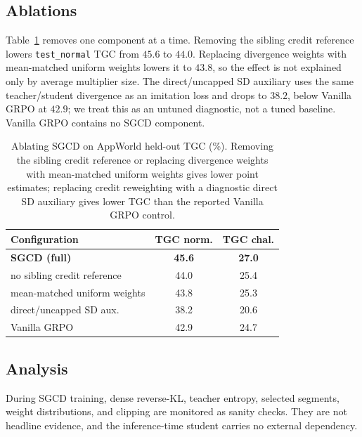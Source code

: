 \subsection{Ablations}
\label{sec:ablations}
Table~\ref{tab:ablation} removes one component at a time. Removing the sibling
credit reference lowers \texttt{test\_normal} TGC from $45.6$ to $44.0$.
Replacing divergence weights with mean-matched uniform weights lowers it to
$43.8$, so the effect is not explained only by average multiplier size. The
direct/uncapped SD auxiliary uses the same teacher/student divergence as an
imitation loss and drops to $38.2$, below Vanilla GRPO at $42.9$; we treat this
as an untuned diagnostic, not a tuned baseline. Vanilla GRPO contains no SGCD
component.

\begin{table}[t]
  \centering
  \venuecompacttablefont
  \setlength{\tabcolsep}{2.5pt}
  \begin{tabular}{@{}lcc@{}}
    \toprule
    \textbf{Configuration} & \textbf{TGC norm.} & \textbf{TGC chal.} \\
    \midrule
    \textbf{SGCD (full)}                         & \textbf{45.6} & \textbf{27.0} \\
    \quad no sibling credit reference             & 44.0 & 25.4 \\
    \quad mean-matched uniform weights            & 43.8 & 25.3 \\
    \quad direct/uncapped SD aux.                  & 38.2 & 20.6 \\
    \midrule
    Vanilla GRPO                                   & 42.9 & 24.7 \\
    \bottomrule
  \end{tabular}
  \caption{Ablating SGCD on AppWorld held-out TGC (\%). Removing the sibling
    credit reference or replacing divergence weights with mean-matched uniform
    weights gives lower point estimates;
    replacing credit reweighting with a diagnostic direct SD auxiliary gives
    lower TGC than the reported Vanilla GRPO control.}
  \label{tab:ablation}
\end{table}

\subsection{Analysis}
During SGCD training, dense reverse-KL, teacher entropy, selected segments,
weight distributions, and clipping are monitored as sanity checks. They are not
headline evidence, and the inference-time student carries no external
dependency.
\FloatBarrier
